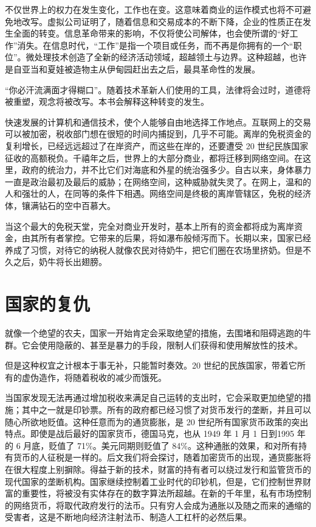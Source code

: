 不仅世界上的权力在发生变化，工作也在变。这意味着商业的运作模式也将不可避免地改写。虚拟公司证明了，随着信息和交易成本的不断下降，企业的性质正在发生全面的转变。信息革命带来的影响，不仅将使公司解体，也会使所谓的“好工作”消失。在信息时代，“工作”是指一个项目或任务，而不再是你拥有的一个“职位”。微处理技术创造了全新的经济活动领域，超越领土与边界。这种超越，也许是自亚当和夏娃被造物主从伊甸园赶出去之后，最具革命性的发展。


“你必汗流满面才得糊口”。随着技术革新人们使用的工具，法律将会过时，道德将被重塑，观念将被改写。本书会解释这种转变的发生。


快速发展的计算机和通信技术，使个人能够自由地选择工作地点。互联网上的交易可以被加密，税收部门想在很短的时间内捕捉到，几乎不可能。离岸的免税资金的复利增长，已经远远超过了在岸资产，而这些在岸的，还要遭受 20 世纪民族国家征收的高额税负。千禧年之后，世界上的大部分商业，都将迁移到网络空间。在这里，政府的统治力，并不比它们对海底和外星的统治强多少。自古以来，身体暴力一直是政治最初及最后的威胁；在网络空间，这种威胁就失灵了。在网上，温和的人和强壮的人，在同等的条件下相遇。网络空间是终极的离岸管辖区，免税的经济体，镶满钻石的空中百慕大。


当这个最大的免税天堂，完全对商业开发时，基本上所有的资金都将成为离岸资金，由其所有者掌控。它带来的后果，将如瀑布般倾泻而下。长期以来，国家已经养成了习惯，对待它的纳税人就像农民对待奶牛，把它们圈在农场里挤奶。但是不久之后，奶牛将长出翅膀。



\section{国家的复仇}
就像一个绝望的农夫，国家一开始肯定会采取绝望的措施，去围堵和阻碍逃跑的牛群。它会使用隐蔽的、甚至是暴力的手段，限制人们获得和使用解放性的技术。


但是这种权宜之计根本于事无补，只能暂时奏效。20 世纪的民族国家，带着它所有的虚伪造作，将随着税收的减少而饿死。


当国家发现无法再通过增加税收来满足自己运转的支出时，它会采取更加绝望的措施；其中之一就是印钞票。所有的政府都已经习惯了对货币发行的垄断，并且可以随心所欲地贬值。这种任意而为的通货膨胀，是 20 世纪所有国家货币政策的突出特点。即使是战后最好的国家货币，德国马克，也从 1949 年 1 月 1 日到1995 年的 6 月底，贬值了 71\%。美元同期则贬值了 84\%。这种通胀的效果，和对所有持有货币的人征税是一样的。后文我们将会探讨，随着加密货币的出现，通货膨胀将在很大程度上别摒除。得益于新的技术，财富的持有者可以绕过发行和监管货币的现代国家的垄断机构。国家继续控制着工业时代的印钞机，但是，它们控制世界财富的重要性，将被没有实体存在的数字算法所超越。在新的千年里，私有市场控制的网络货币，将取代政府发行的法币。只有穷人会成为通胀以及随之而来的通缩的受害者，这是不断地向经济注射法币、制造人工杠杆的必然后果。


